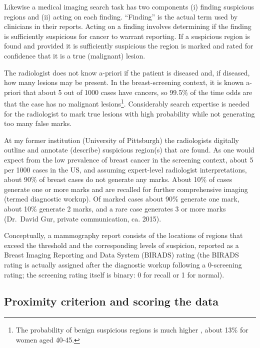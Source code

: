 \documentclass[
]{book}
\begin{document}
Likewise a medical imaging search task has two components (i) finding suspicious regions and (ii) acting on each finding. ``Finding'' is the actual term used by clinicians in their reports. Acting on a finding involves determining if the finding is sufficiently suspicious for cancer to warrant reporting. If a suspicious region is found and provided it is sufficiently suspicious the region is marked and rated for confidence that it is a true (malignant) lesion.

The radiologist does not know a-priori if the patient is diseased and, if diseased, how many lesions may be present. In the breast-screening context, it is known a-priori that about 5 out of 1000 cases have cancers, so 99.5\% of the time odds are that the case has no malignant lesions\footnote{The probability of benign suspicious regions is much higher \citep{Ernster1981Epidemiology}, about 13\% for women aged 40-45.}. Considerably search expertise is needed for the radiologist to mark true lesions with high probability while not generating too many false marks.

At my former institution (University of Pittsburgh) the radiologists digitally outline and annotate (describe) suspicious region(s) that are found. As one would expect from the low prevalence of breast cancer in the screening context, about 5 per 1000 cases in the US, and assuming expert-level radiologist interpretations, about 90\% of breast cases do not generate any marks. About 10\% of cases generate one or more marks and are recalled for further comprehensive imaging (termed diagnostic workup). Of marked cases about 90\% generate one mark, about 10\% generate 2 marks, and a rare case generates 3 or more marks (Dr.~David Gur, private communication, ca. 2015).

Conceptually, a mammography report consists of the locations of regions that exceed the threshold and the corresponding levels of suspicion, reported as a Breast Imaging Reporting and Data System (BIRADS) rating (the BIRADS rating is actually assigned after the diagnostic workup following a 0-screening rating; the screening rating itself is binary: 0 for recall or 1 for normal).

\hypertarget{froc-paradigm-scoring-the-data}{%
\subsection{Proximity criterion and scoring the data}\label{froc-paradigm-scoring-the-data}}
\end{document}
